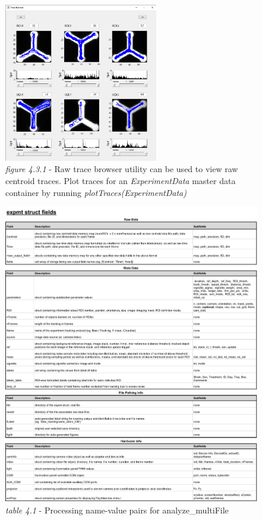\documentclass[11pt]{article}
\begin{document}
\vspace*{0.75cm}
\begin{figure}[h!]
	\begin{center}
		\includegraphics[width=0.6\textwidth]{images/outputs/trace_browser.png}
		\caption*{\footnotesize {\textit{figure 4.3.1} - Raw trace browser utility can be used to view raw centroid traces. Plot traces for an \textit{\textit{ExperimentData}} master data container by running \textit{plotTraces(\textit{ExperimentData})}}}
	\end{center}
\end{figure}

\newpage
\hypertarget{\textit{ExperimentData}table}{}
\begin{figure}[h!]
	\begin{center}
		\includegraphics[width=1\textwidth]{images/outputs/expmt_fields.pdf}
		\caption*{\footnotesize {\textit{table 4.1} - Processing name-value pairs for analyze\_multiFile}}
	\end{center}
\end{figure}
\end{document}

